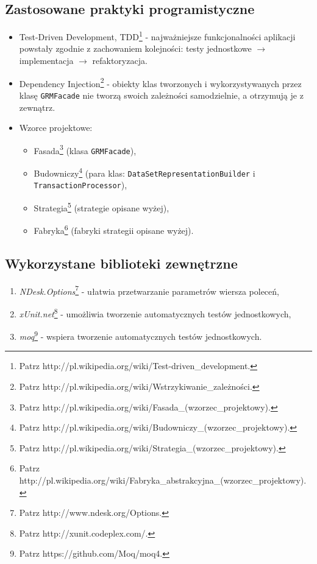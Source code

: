 \documentclass[a4paper,10pt]{article}
\begin{document}
 \subsection{Zastosowane praktyki programistyczne}
 \begin{itemize}
  \item Test-Driven Development, TDD\footnote{Patrz http://pl.wikipedia.org/wiki/Test-driven\_development.} - najważniejsze funkcjonalności aplikacji powstały zgodnie z zachowaniem kolejności: testy jednostkowe $\rightarrow$ implementacja $\rightarrow$ refaktoryzacja.
  \item Dependency Injection\footnote{Patrz http://pl.wikipedia.org/wiki/Wstrzykiwanie\_zależności.} - obiekty klas tworzonych i wykorzystywanych przez klasę \verb+GRMFacade+ nie tworzą swoich zależności samodzielnie, a otrzymują je z zewnątrz.
  \item Wzorce projektowe:
   \begin{itemize}
    \item Fasada\footnote{Patrz http://pl.wikipedia.org/wiki/Fasada\_(wzorzec\_projektowy).} (klasa \verb+GRMFacade+),
    \item Budowniczy\footnote{Patrz http://pl.wikipedia.org/wiki/Budowniczy\_(wzorzec\_projektowy).} (para klas: \verb+DataSetRepresentationBuilder+ i \verb+TransactionProcessor+),
    \item Strategia\footnote{Patrz http://pl.wikipedia.org/wiki/Strategia\_(wzorzec\_projektowy).} (strategie opisane wyżej),
    \item Fabryka\footnote{Patrz http://pl.wikipedia.org/wiki/Fabryka\_abstrakcyjna\_(wzorzec\_projektowy).} (fabryki strategii opisane wyżej).
   \end{itemize}
 \end{itemize}
 
 
 \subsection{Wykorzystane biblioteki zewnętrzne}
 \begin{enumerate}
  \item \emph{NDesk.Options}\footnote{Patrz http://www.ndesk.org/Options.} - ułatwia przetwarzanie parametrów wiersza poleceń,
  \item \emph{xUnit.net}\footnote{Patrz http://xunit.codeplex.com/.} - umożliwia tworzenie automatycznych testów jednostkowych,
  \item \emph{moq}\footnote{Patrz https://github.com/Moq/moq4.} - wspiera tworzenie automatycznych testów jednostkowych.
 \end{enumerate}
\end{document}
